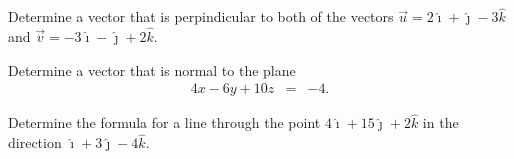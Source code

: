 
\begin{problem}
\item Determine a vector that is perpindicular to both of the vectors
  $\vec{u}=2\hat{\imath} + \hat{\jmath} - 3\hat{k}$ and
  $\vec{v}=-3\hat{\imath} - \hat{\jmath} + 2\hat{k}$.
  \vfill
\item Determine a vector that is normal to the plane
  \begin{eqnarray*}
    4x - 6y + 10z & = & -4.
  \end{eqnarray*}
  \vfill
\item Determine the formula for a line through the point
  $4\hat{\imath} + 15\hat{\jmath} + 2\hat{k}$ in the direction
  $\hat{\imath} + 3\hat{\jmath} - 4\hat{k}$.
  \vfill
\end{problem}


